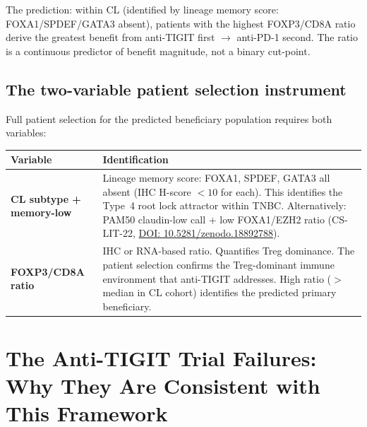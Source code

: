 \documentclass[12pt, a4paper]{article}
\begin{document}
The prediction: within CL (identified by lineage
memory score: FOXA1/SPDEF/GATA3 absent), patients
with the highest FOXP3/CD8A ratio derive the greatest
benefit from anti-TIGIT first $\rightarrow$ anti-PD-1
second. The ratio is a continuous predictor of
benefit magnitude, not a binary cut-point.

\subsection{The two-variable patient selection
instrument}

Full patient selection for the predicted beneficiary
population requires both variables:

\begin{center}
\begin{tabular}{p{4cm}p{7.5cm}}
\toprule
\textbf{Variable} & \textbf{Identification} \\
\midrule
\textbf{CL subtype + memory-low} &
Lineage memory score: FOXA1, SPDEF, GATA3 all absent
(IHC H-score $<10$ for each). This identifies the
Type~4 root lock attractor within TNBC.
Alternatively: PAM50 claudin-low call $+$
low FOXA1/EZH2 ratio (CS-LIT-22,
\href{https://doi.org/10.5281/zenodo.18892788}
{DOI: 10.5281/zenodo.18892788}). \\[0.5em]
\textbf{FOXP3/CD8A ratio} &
IHC or RNA-based ratio. Quantifies Treg dominance.
The patient selection confirms the Treg-dominant
immune environment that anti-TIGIT addresses.
High ratio ($>$ median in CL cohort) identifies
the predicted primary beneficiary. \\
\bottomrule
\end{tabular}
\end{center}

\section{The Anti-TIGIT Trial Failures: Why They
Are Consistent with This Framework}
\end{document}
